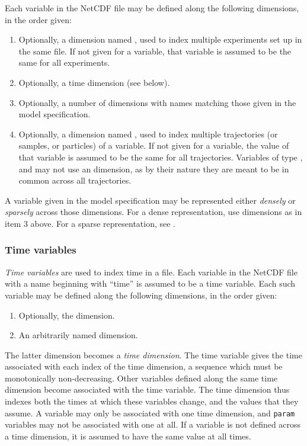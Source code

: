 Each variable in the NetCDF file may be defined along the following
dimensions, in the order given:
\begin{enumerate}
\item Optionally, a dimension named , used to index multiple
  experiments set up in the same file. If not given for a variable, that
  variable is assumed to be the same for all experiments.
\item Optionally, a time dimension (see below).
\item Optionally, a number of dimensions with names matching those given in
  the model specification.
\item Optionally, a dimension named , used to index multiple
  trajectories (or samples, or particles) of a variable. If not given for a
  variable, the value of that variable is assumed to be the same for all
  trajectories. Variables of type ,  and 
  may not use an  dimension, as by their nature they are meant to be
  in common across all trajectories.
\end{enumerate}

A variable given in the model specification may be represented either
\emph{densely} or \emph{sparsely} across those dimensions. For a dense
representation, use dimensions as in item 3 above. For a sparse
representation, see .

\subsubsection{Time variables\label{Time_variables}}

\emph{Time variables} are used to index time in a file. Each variable in the
NetCDF file with a name beginning with ``time'' is assumed to be a time
variable. Each such variable may be defined along the following dimensions, in
the order given:
\begin{enumerate}
\item Optionally, the  dimension.
\item An arbitrarily named dimension.
\end{enumerate}
The latter dimension becomes a \emph{time dimension}. The time variable gives the time associated with each index of
the time dimension, a sequence which must be monotonically
non-decreasing. Other variables defined along the same time dimension become
associated with the time variable. The time dimension thus indexes both the
times at which these variables change, and the values that they assume. A
variable may only be associated with one time dimension, and \texttt{param}
variables may not be associated with one at all. If a variable is not defined
across a time dimension, it is assumed to have the same value at all times.

